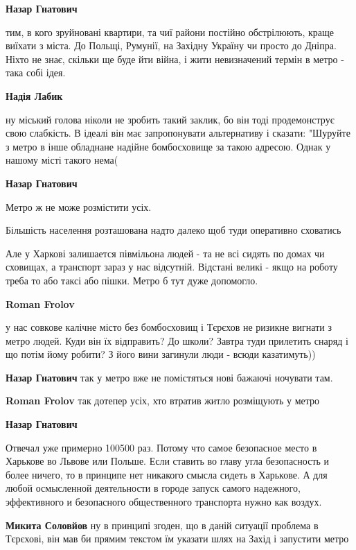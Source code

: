 \begin{itemize}
\begin{itemize}
\textbf{Назар Гнатович} 

тим, в кого зруйновані квартири, та чиї райони постійно обстрілюють, краще
виїхати з міста. До Польщі, Румунії, на Західну Україну чи просто до Дніпра.
Ніхто не знає, скільки ще буде йти війна, і жити невизначений термін в метро -
така собі ідея.

\textbf{Надія Лабик} 

ну міський голова ніколи не зробить такий заклик, бо він тоді продемонструє
свою слабкість. В ідеалі він має запропонувати альтернативу і сказати: "Шуруйте
з метро в інше обладнане надійне бомбосховище за такою адресою. Однак у нашому
місті такого нема(

\textbf{Назар Гнатович} 

Метро ж не може розмістити усіх.

Більшість населення розташована надто далеко щоб туди оперативно сховатись

Але у Харкові залишается півмільона людей - та не всі сидять по домах чи
сховищах, а транспорт зараз у нас відсутній. Відстані великі - якщо на роботу
треба то або таксі або пішки. Метро б тут дуже допомогло.

\textbf{Roman Frolov} 

у нас совкове калічне місто без бомбосховищ і Тєрєхов не ризикне вигнати з
метро людей. Куди він їх відправить? До школи? Завтра туди прилетить снаряд і
що потім йому робити? З його вини загинули люди - всюди казатимуть))

\textbf{Назар Гнатович} так у метро вже не помістяться нові бажаючі ночувати там.

\textbf{Roman Frolov} так дотепер усіх, хто втратив житло розміщують у метро

\textbf{Назар Гнатович} 

Отвечал уже примерно 100500 раз. Потому что самое безопасное место в Харькове
во Львове или Польше. Если ставить во главу угла безопасность и более ничего,
то в принципе нет никакого смысла сидеть в Харькове. А для любой осмысленной
деятельности в городе запуск самого надежного, эффективного и безопасного
общественного транспорта нужно как воздух.

\textbf{Микита Соловйов} ну в принципі згоден, що в даній ситуації проблема в Тєрєхові, він мав би прямим текстом їм указати шлях на Захід і запустити метро


\end{itemize}
\end{itemize}
